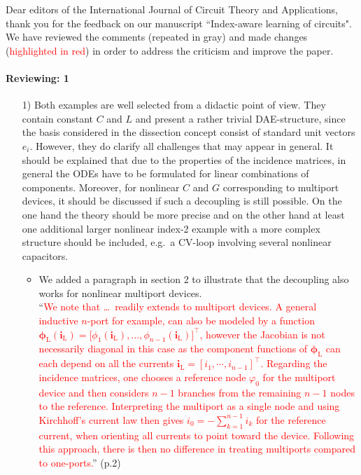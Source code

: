 \documentclass[a4paper, 10pt,
    ]{article}
\newcommand{\mb}[1]{\mathbf{#1}}
\newcommand{\mr}[1]{\mathrm{#1}}
\newcommand{\T}{{\!\top}}
\newcommand{\phiL}{\boldsymbol{\phi}_\mr{L}}
\renewcommand{\i}[1]{\mb{i}_\mr{#1}}
\begin{document}
    Dear editors of the International Journal of Circuit Theory and Applications,\\

    thank you for the feedback on our manuscript ``Index-aware learning of circuits". We have reviewed the comments (\textcolor{TUDa-0c}{repeated in gray}) and made changes (\textcolor{red}{highlighted in red}) in order to address the criticism and improve the paper.\\

    \paragraph{Reviewing: 1}
    \begin{itemize}
        \item[1)] \textcolor{TUDa-0c}{Both examples are well selected from a didactic point of view. They contain constant $C$ and $L$ and present a rather trivial DAE-structure, since the basis considered in the dissection concept consist of standard unit vectors $e_i$. However, they do clarify all challenges that may appear in general. It should be explained that due to the properties of the incidence matrices, in general the ODEs have to be formulated for linear combinations of components. Moreover, for nonlinear $C$ and $G$ corresponding to multiport devices, it should be discussed if such a decoupling is still possible. On the one hand the theory should be more precise and on the other hand at least one additional larger nonlinear index-2 example with a more complex structure should be included, e.g.~a CV-loop involving several nonlinear capacitors.}
        \begin{itemize}
            \item We added a paragraph in section 2 to illustrate that the decoupling also works for nonlinear multiport devices.\\
            ``\textcolor{red}{We note that \dots\ readily extends to multiport devices. A general inductive $n$-port for example, can also be modeled by a function $\phiL(\i{L}) = \big[ \phi_1(\i{L}), \dotsc, \phi_{n-1}(\i{L}) \big]^\T$, however the Jacobian is not necessarily diagonal in this case as the component functions of $\phiL$ can each depend on all the currents $\i{L} = [i_1, \cdots, i_{n-1}]^\T$. Regarding the incidence matrices, one chooses a reference node $\varphi_0$ for the multiport device and then considers $n-1$ branches from the remaining $n-1$ nodes to the reference. Interpreting the multiport as a single node and using Kirchhoff's current law then gives $i_0 = -\sum_{k=1}^{n-1} i_k$ for the reference current, when orienting all currents to point toward the device. Following this approach, there is then no difference in treating multiports compared to one-ports.}'' (p.2)

\end{itemize}
\end{itemize}
\end{document}
